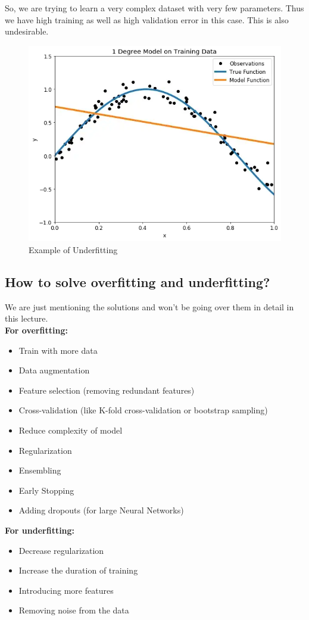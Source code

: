\documentclass[12pt]{article}
\begin{document}
\noindent So, we are trying to learn a very complex dataset with very few parameters. Thus we have high training as well as high validation error in this case. This is also undesirable.\\

\begin{figure}[H]
    \centering
    \includegraphics[width=.5\textwidth]{Underfit.jpg}
    \caption{Example of Underfitting}
    \label{Figure 3}
\end{figure}

\subsection{How to solve overfitting and underfitting?}
We are just mentioning the solutions and won't be going over them in detail in this lecture.\\

\noindent \textbf{For overfitting:}
\begin{itemize}
    \item Train with more data
    \item Data augmentation
    \item Feature selection (removing redundant features)
    \item Cross-validation (like K-fold cross-validation or bootstrap sampling)
    \item Reduce complexity of model
    \item Regularization
    \item Ensembling
    \item Early Stopping
    \item Adding dropouts (for large Neural Networks)
\end{itemize}

\noindent \textbf{For underfitting:}
\begin{itemize}
    \item Decrease regularization
    \item Increase the duration of training
    \item Introducing more features
    \item Removing noise from the data
\end{itemize}
\end{document}
